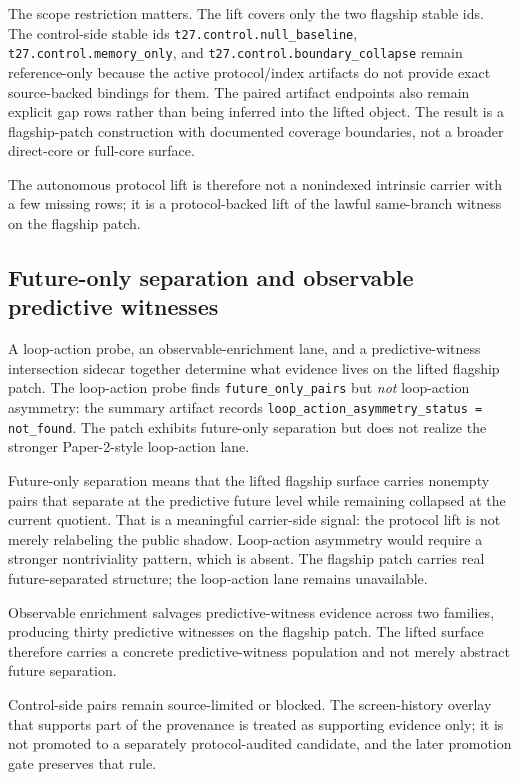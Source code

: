 \documentclass[11pt]{article}
\theoremstyle{definition}
\begin{document}
The scope restriction matters. The lift covers only the two flagship stable ids. The
control-side stable ids
\nolinkurl{t27.control.null_baseline}, \nolinkurl{t27.control.memory_only}, and
\nolinkurl{t27.control.boundary_collapse} remain reference-only because the active
protocol/index artifacts do not provide exact source-backed bindings for them. The
paired artifact endpoints also remain explicit gap rows rather than being inferred
into the lifted object. The result is a flagship-patch construction with documented
coverage boundaries, not a broader direct-core or full-core surface.

The autonomous protocol lift is therefore not a nonindexed intrinsic carrier with a
few missing rows; it is a protocol-backed lift of the lawful same-branch witness on
the flagship patch.

\subsection{Future-only separation and observable predictive witnesses}

A loop-action probe, an observable-enrichment lane, and a predictive-witness
intersection sidecar together determine what evidence lives on the lifted flagship
patch. The loop-action probe finds \texttt{future\_only\_pairs} but \emph{not}
loop-action asymmetry: the summary artifact records
\texttt{loop\_action\_asymmetry\_status = not\_found}. The patch exhibits future-only
separation but does not realize the stronger Paper-2-style loop-action lane.

Future-only separation means that the lifted flagship surface carries nonempty pairs
that separate at the predictive future level while remaining collapsed at the current
quotient. That is a meaningful carrier-side signal: the protocol lift is not merely
relabeling the public shadow. Loop-action asymmetry would require a stronger
nontriviality pattern, which is absent. The flagship patch carries real future-separated
structure; the loop-action lane remains unavailable.

Observable enrichment salvages predictive-witness evidence across two families,
producing thirty predictive witnesses on the flagship patch. The lifted surface
therefore carries a concrete predictive-witness population and not merely abstract
future separation.

Control-side pairs remain source-limited or blocked. The screen-history overlay that
supports part of the provenance is treated as supporting evidence only; it is not
promoted to a separately protocol-audited candidate, and the later promotion gate
preserves that rule.
\end{document}
